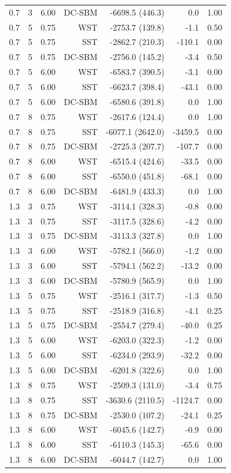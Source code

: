 \begin{table}[!h]
\begin{tabular}[t]{rrrrrrr}
0.7 & 3 & 6.00 & DC-SBM & -6698.5 (446.3) & 0.0 & 1.00\\
0.7 & 5 & 0.75 & WST & -2753.7 (139.8) & -1.1 & 0.50\\
0.7 & 5 & 0.75 & SST & -2862.7 (210.3) & -110.1 & 0.00\\
0.7 & 5 & 0.75 & DC-SBM & -2756.0 (145.2) & -3.4 & 0.50\\
0.7 & 5 & 6.00 & WST & -6583.7 (390.5) & -3.1 & 0.00\\
0.7 & 5 & 6.00 & SST & -6623.7 (398.4) & -43.1 & 0.00\\
0.7 & 5 & 6.00 & DC-SBM & -6580.6 (391.8) & 0.0 & 1.00\\
0.7 & 8 & 0.75 & WST & -2617.6 (124.4) & 0.0 & 1.00\\
0.7 & 8 & 0.75 & SST & -6077.1 (2642.0) & -3459.5 & 0.00\\
0.7 & 8 & 0.75 & DC-SBM & -2725.3 (207.7) & -107.7 & 0.00\\
0.7 & 8 & 6.00 & WST & -6515.4 (424.6) & -33.5 & 0.00\\
0.7 & 8 & 6.00 & SST & -6550.0 (451.8) & -68.1 & 0.00\\
0.7 & 8 & 6.00 & DC-SBM & -6481.9 (433.3) & 0.0 & 1.00\\
1.3 & 3 & 0.75 & WST & -3114.1 (328.3) & -0.8 & 0.00\\
1.3 & 3 & 0.75 & SST & -3117.5 (328.6) & -4.2 & 0.00\\
1.3 & 3 & 0.75 & DC-SBM & -3113.3 (327.8) & 0.0 & 1.00\\
1.3 & 3 & 6.00 & WST & -5782.1 (566.0) & -1.2 & 0.00\\
1.3 & 3 & 6.00 & SST & -5794.1 (562.2) & -13.2 & 0.00\\
1.3 & 3 & 6.00 & DC-SBM & -5780.9 (565.9) & 0.0 & 1.00\\
1.3 & 5 & 0.75 & WST & -2516.1 (317.7) & -1.3 & 0.50\\
1.3 & 5 & 0.75 & SST & -2518.9 (316.8) & -4.1 & 0.25\\
1.3 & 5 & 0.75 & DC-SBM & -2554.7 (279.4) & -40.0 & 0.25\\
1.3 & 5 & 6.00 & WST & -6203.0 (322.3) & -1.2 & 0.00\\
1.3 & 5 & 6.00 & SST & -6234.0 (293.9) & -32.2 & 0.00\\
1.3 & 5 & 6.00 & DC-SBM & -6201.8 (322.6) & 0.0 & 1.00\\
1.3 & 8 & 0.75 & WST & -2509.3 (131.0) & -3.4 & 0.75\\
1.3 & 8 & 0.75 & SST & -3630.6 (2110.5) & -1124.7 & 0.00\\
1.3 & 8 & 0.75 & DC-SBM & -2530.0 (107.2) & -24.1 & 0.25\\
1.3 & 8 & 6.00 & WST & -6045.6 (142.7) & -0.9 & 0.00\\
1.3 & 8 & 6.00 & SST & -6110.3 (145.3) & -65.6 & 0.00\\
1.3 & 8 & 6.00 & DC-SBM & -6044.7 (142.7) & 0.0 & 1.00\\
\bottomrule
\end{tabular}
\end{table}
